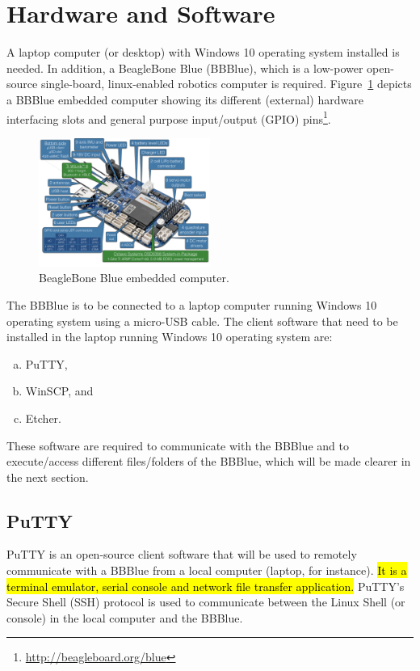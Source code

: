 \section{Hardware and Software}
A laptop computer (or desktop) with Windows 10 operating system installed is needed. In addition, a  BeagleBone Blue (BBBlue), which is a low-power open-source single-board, linux-enabled robotics computer is required. Figure~\ref{fig:BBBlue} depicts a BBBlue embedded computer showing its different  (external) hardware  interfacing slots and general purpose input/output (GPIO)  pins\footnote{\href{http://beagleboard.org/blue}{http://beagleboard.org/blue}}. %
%
\begin{figure}
    \centering
    \includegraphics[width= 0.5\textwidth]{figs/img/Lab0/BeagleBone_Blue_balloons.png}
    \caption[BeagleBone Blue single-board computer.]{BeagleBone Blue embedded computer.}
    \label{fig:BBBlue}
\end{figure}
%
The BBBlue is to be connected to a laptop computer running Windows 10 operating
system using a micro-USB cable. The client software that need to be installed in
the laptop running Windows 10 operating system are:
\begin{enumerate}[a)]
    \item PuTTY,
    \item WinSCP, and 
    \item Etcher.
\end{enumerate}
%
These software are required to communicate with the BBBlue and to execute/access different files/folders of the BBBlue, which will be made clearer in the next section. 

\subsection{PuTTY}
\label{sec:putty}
PuTTY is an open-source client software that will be used to remotely
communicate with a BBBlue from a local computer (laptop, for instance). \hl{It
  is a terminal emulator, serial console and network file transfer application.}
PuTTY's Secure Shell (SSH) protocol is used to communicate between the Linux
Shell (or console) in the local computer and the BBBlue.

